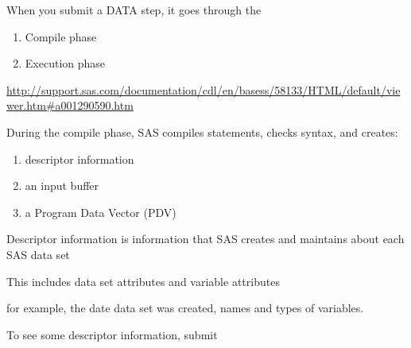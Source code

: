 \begin{frame}[label=action]
When you submit a DATA step, it goes through the
\vskip10pt
\begin{enumerate}
    \item Compile phase \hyperlink{compilephases}{}
    \item Execution phase \hyperlink{execution}{}
\end{enumerate}
\vskip10pt
\url{http://support.sas.com/documentation/cdl/en/basess/58133/HTML/default/viewer.htm#a001290590.htm}
\end{frame}

\begin{frame}[label=compilephases]
During the compile phase, SAS compiles statements, checks syntax, and creates:
\begin{enumerate}
    \item  descriptor information \hyperlink{descriptor}{}
    \item  an input buffer \hyperlink{input}{}
    \item  a Program Data Vector (PDV) \hyperlink{pdvC}{}
\end{enumerate}
\begin{flushright}
\hyperlink{action}{}
\end{flushright}
\end{frame}

\begin{frame}[label=descriptor]
\bi
\item Descriptor information is information that SAS creates and maintains about each SAS data set
\item This includes data set attributes and variable attributes
\item for example, the date data set was created, names and types of variables.
\item To see some descriptor information, submit
\item[] 
\ei
\begin{flushright}
\hyperlink{compilephases}{}
\end{flushright}
\end{frame}



